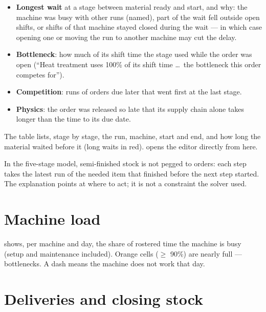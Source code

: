 \begin{itemize}
  \item \textbf{Longest wait} at a stage between material ready and start, and why: the machine was busy with
        other runs (named), part of the wait fell outside open shifts, or shifts of that machine stayed closed
        during the wait --- in which case opening one or moving the run to another machine may cut the delay.
  \item \textbf{Bottleneck}: how much of its shift time the stage used while the order was open (``Heat
        treatment uses 100\% of its shift time \dots\ the bottleneck this order competes for'').
  \item \textbf{Competition}: runs of orders due later that went first at the last stage.
  \item \textbf{Physics}: the order was released so late that its supply chain alone takes longer than the time
        to its due date.
\end{itemize}

The table  lists, stage by stage, the run, machine, start and
end, and how long the material waited before it (long waits in red).  opens the editor
directly from here.

\begin{note}
In the five-stage model, semi-finished stock is not pegged to orders: each step takes the latest run of the
needed item that finished before the next step started. The explanation points at where to act; it is not a
constraint the solver used.
\end{note}

\section{Machine load}

 shows, per machine and day, the share of rostered time the machine is busy (setup and
maintenance included). Orange cells ($\geq$ 90\%) are nearly full --- bottlenecks. A dash means the machine
does not work that day.


\section{Deliveries and closing stock}

